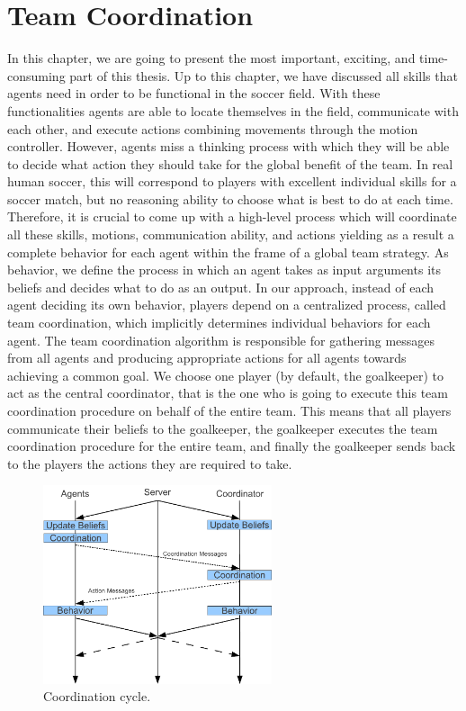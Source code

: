 \chapter{Team Coordination}
\label{Coordination}

In this chapter, we are going to present the most important, exciting, and time-consuming part of this thesis. Up to this chapter, we have discussed all skills that agents need in order to be functional in the soccer field. With these functionalities agents are able to locate themselves in the field, communicate with each other, and execute actions combining movements through the motion controller. However, agents miss a thinking process with which they will be able to decide what action they should take for the global benefit of the team. In real human soccer, this will correspond to players with excellent individual skills for a soccer match, but no reasoning ability to choose what is best to do at each time. Therefore, it is crucial to come up with a high-level process which will coordinate all these skills, motions, communication ability, and actions yielding as a result a complete behavior for each agent within the frame of a global team strategy. As behavior, we define the process in which an agent takes as input arguments its beliefs and decides what to do as an output. In our approach, instead of each agent deciding its own behavior, players depend on a centralized process, called team coordination, which implicitly determines individual behaviors for each agent.  The team coordination algorithm is responsible for gathering messages from all agents and producing appropriate actions for all agents towards achieving a common goal. We choose one player (by default, the goalkeeper) to act as the central coordinator, that is the one who is going to execute this team coordination procedure on behalf of the entire team. This means that all players communicate their beliefs to the goalkeeper, the goalkeeper executes the team coordination procedure for the entire team, and finally the goalkeeper sends back to the players the actions they are required to take.


\begin{figure}[t!]
\centering
  \includegraphics[width=0.6\textwidth]{Chapter4/figures/CoordinationCycle.pdf}
  \caption{Coordination cycle.} 
  \label{fig:CoordinationCycle}
\end{figure}


